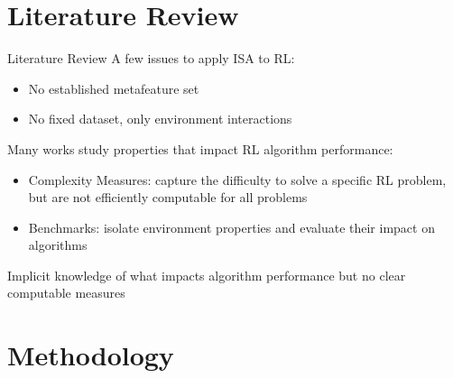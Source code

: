 \documentclass[aspectratio=169]{beamer}
\begin{document}
\section{Literature Review}
\begin{frame}{Literature Review}
  A few issues to apply ISA to RL:
  \begin{itemize}
    \item No established metafeature set
    \item No fixed dataset, only environment interactions
  \end{itemize}
  \vspace{0.3em}
  Many works study properties that impact RL algorithm performance:
  \begin{itemize}
    \item Complexity Measures: capture the difficulty to solve a specific RL problem, %
    but are not efficiently computable for all problems
    \item Benchmarks: isolate environment properties and evaluate their impact on algorithms
  \end{itemize}

  Implicit knowledge of what impacts algorithm performance but no clear computable measures

\end{frame}

\section{Methodology}
\end{document}
